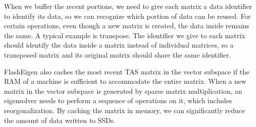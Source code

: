 When we buffer the recent portions, we need to give each matrix a data identifier
to identify its data, so we can recognize which portion of data can be reused.
For certain operations, even though a new matrix is created, the data inside
remains the same. A typical example is transpose. The identifier we give to
each matrix should identify the data inside a matrix instead of individual matrices,
so a transposed matrix and its original matrix should share the same identifier.

FlashEigen also caches the most recent TAS matrix in the vector subspace if
the RAM of a machine is sufficient to accommodate the entire matrix.
When a new matrix in the vector subspace is generated by sparse matrix
multiplication, an eigensolver needs to perform a sequence of operations on it,
which includes reorgonalization. By caching the matrix in memory, we can
significantly reduce the amount of data written to SSDs.
